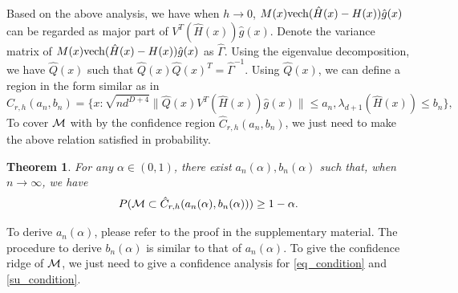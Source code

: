 \documentclass[aos,preprint]{imsart}
\newtheorem{theorem}{Theorem}[section]
\theoremstyle{remark}
\begin{document}
Based on the above analysis, we have when $h\rightarrow 0$, $M(x){\rm vech}(\hat{H}(x)-H(x))\hat{g}(x)$ can be regarded as major part of $V^T({\hat{H}}(x))\hat{g}(x)$. Denote the variance matrix of $M(x){\rm vech}(\hat{H}(x)-H(x))\hat{g}(x)$ as $\hat{\Gamma}$. Using the eigenvalue decomposition, we have $\hat{Q}(x)$ such that $\hat{Q}(x)\hat{Q}(x)^T = \hat{\Gamma}^{-1} $. Using $\hat{Q}(x)$, we can define a region in the form similar as in \cite{qiao2020asymptotic}
\[
\hat{C}_{r,h}(a_n, b_n) = \{x: \sqrt{nd^{D+4}}\|\hat{Q}(x) {V}^T({\hat{H}}(x))\hat{g}(x)\|\leq a_n, \lambda_{d+1}(\hat{H}(x))\leq b_n\},
\]
To cover $\cal M$ with by the confidence region $\hat{C}_{r,h}(a_n, b_n)$, we just need to make the above relation satisfied in probability.
\begin{theorem}\label{confidence}
For any $\alpha\in(0,1)$, there exist $a_n(\alpha), b_n(\alpha)$ such that, when $n\rightarrow \infty$, we have
\[
P({\cal M}\subset \hat{C}_{r,h}(a_n(\alpha), b_n(\alpha)) ) \geq 1-\alpha.
\]
\end{theorem}
To derive $a_n(\alpha)$, please refer to the proof in the supplementary material. %
The procedure to derive $b_n(\alpha)$ is similar to that of $a_n(\alpha)$.
 To give the confidence ridge of $\cal M$, we just need to give a confidence analysis for \eqref{eq_condition} and \eqref{su_condition}.
\end{document}
